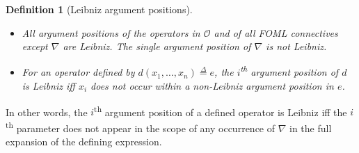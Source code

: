 \documentclass{easychair}
\renewcommand{\th}{\textsuperscript{th}\xspace}
\newcommand{\modal}{\nabla}
\newcommand{\OO}{\mathcal{O}}
\newcommand{\edmargin}[2]{\marginpar{\raggedright\footnotesize\color{red}#1: #2}}
\newcommand{\edmargin}[2]{}
\def\llmargin{\edmargin{LL}}
\def\jknote{\ednote{JK}}
\newtheorem{definition}[theorem]{Definition}
\newcommand{\deq}{\mathrel{\stackrel{\scriptscriptstyle\Delta}{=}}}
\begin{document}
\begin{definition}[Leibniz argument positions]\label{def:leibniz-pos}\mbox{}
  \begin{itemize}
  \item All argument positions of the operators in $\OO$ and of all FOML
    connectives except $\modal$ are Leibniz. The single argument position of $\modal$
    is not Leibniz.
  \item For an operator defined by $d(x_1,\ldots,x_n) \deq e$, the
    $i$\th argument position of $d$ is Leibniz iff
    $x_i$ does not occur within a non-Leibniz argument position in $e$.
  \end{itemize}
\end{definition}
%
In other words, the $i$\th argument position of a defined operator is Leibniz iff
the $i$\th parameter does not appear in the scope of any
 occurrence of $\modal$
in the full expansion of the defining expression.
\end{document}
